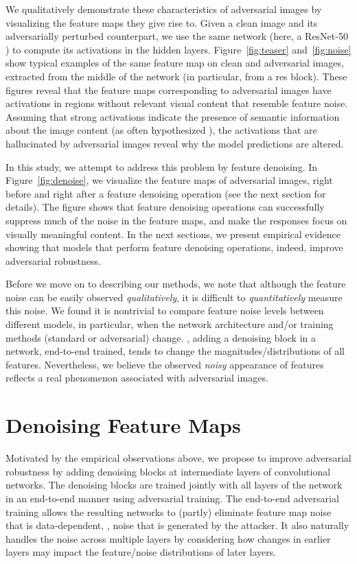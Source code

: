 \documentclass[10pt,twocolumn,letterpaper]{article}
\begin{document}
We qualitatively demonstrate these characteristics of adversarial images by visualizing the feature maps they give rise to. Given a clean image and its adversarially perturbed counterpart, we use the same network (here, a ResNet-50 \cite{He2016}) to compute its activations in the hidden layers. Figure~\ref{fig:teaser} and~\ref{fig:noise} show typical examples of the same feature map on clean and adversarial images, extracted from the middle of the network (in particular, from a res block). These figures reveal that the feature maps corresponding to adversarial images have activations in regions without relevant visual content that resemble feature noise. Assuming that strong activations indicate the presence of semantic information about the image content (as often hypothesized \cite{Zeiler2014}), the activations that are hallucinated by adversarial images reveal why the model predictions are altered.

In this study, we attempt to address this problem by feature denoising. In Figure~\ref{fig:denoise}, we visualize the feature maps of adversarial images, right before and right after a feature denoising operation (see the next section for details). The figure shows that feature denoising operations can successfully suppress much of the noise in the feature maps, and make the responses focus on visually meaningful content. In the next sections, we present empirical evidence showing that models that perform feature denoising operations, indeed, improve adversarial robustness.

Before we move on to describing our methods, we note that although the feature noise can be easily observed \emph{qualitatively}, it is difficult to \emph{quantitatively} measure this noise. We found it is nontrivial to compare feature noise levels between different models, in particular, when the network architecture and/or training methods (standard or adversarial) change. \Eg, adding a denoising block in a network, end-to-end trained, tends to change the magnitudes/distributions of all features. Nevertheless, we believe the observed \emph{noisy} appearance of features reflects a real phenomenon associated with adversarial images.

\section{Denoising Feature Maps}\label{sec:denoise}

Motivated by the empirical observations above, we propose to improve adversarial robustness by adding denoising blocks at intermediate layers of convolutional networks. The denoising blocks are trained jointly with all layers of the network in an end-to-end manner using adversarial training. The end-to-end adversarial training allows the resulting networks to (partly) eliminate feature map noise that is data-dependent, \ie, noise that is generated by the attacker. It also naturally handles the noise across multiple layers by considering how changes in earlier layers may impact the feature/noise distributions of later layers.
\end{document}
